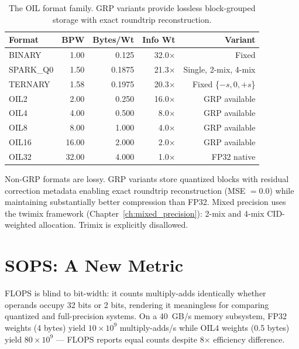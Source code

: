 \begin{table}[htbp]
\centering
\caption{The OIL format family. GRP variants provide lossless block-grouped
storage with exact roundtrip reconstruction.}
\label{tab:oil_formats}
\begin{tabular}{lrrrr}
\toprule
\textbf{Format} & \textbf{BPW} & \textbf{Bytes/Wt} &
\textbf{Info Wt} & \textbf{Variant} \\
\midrule
BINARY      & 1.00  & 0.125   & 32.0$\times$ & Fixed \\
SPARK\_Q0   & 1.50  & 0.1875  & 21.3$\times$ & Single, 2-mix, 4-mix \\
TERNARY     & 1.58  & 0.1975  & 20.3$\times$ & Fixed \{$-s, 0, +s$\} \\
OIL2        & 2.00  & 0.250   & 16.0$\times$ & GRP available \\
OIL4        & 4.00  & 0.500   & 8.0$\times$  & GRP available \\
OIL8        & 8.00  & 1.000   & 4.0$\times$  & GRP available \\
OIL16       & 16.00 & 2.000   & 2.0$\times$  & GRP available \\
OIL32       & 32.00 & 4.000   & 1.0$\times$  & FP32 native \\
\bottomrule
\end{tabular}
\end{table}

Non-GRP formats are lossy. GRP variants store quantized blocks with residual
correction metadata enabling exact roundtrip reconstruction (MSE $= 0.0$)
while maintaining substantially better compression than FP32. Mixed
precision uses the twimix framework (Chapter~\ref{ch:mixed_precision}):
2-mix and 4-mix CID-weighted allocation. Trimix is explicitly disallowed.

\section{SOPS: A New Metric}
\label{sec:sops_metric}

FLOPS is blind to bit-width: it counts multiply-adds identically whether
operands occupy 32 bits or 2 bits, rendering it meaningless for comparing
quantized and full-precision systems. On a 40~GB/s memory subsystem, FP32
weights (4 bytes) yield $10 \times 10^9$ multiply-adds/s while OIL4 weights
(0.5 bytes) yield $80 \times 10^9$ --- FLOPS reports equal counts despite
8$\times$ efficiency difference.

